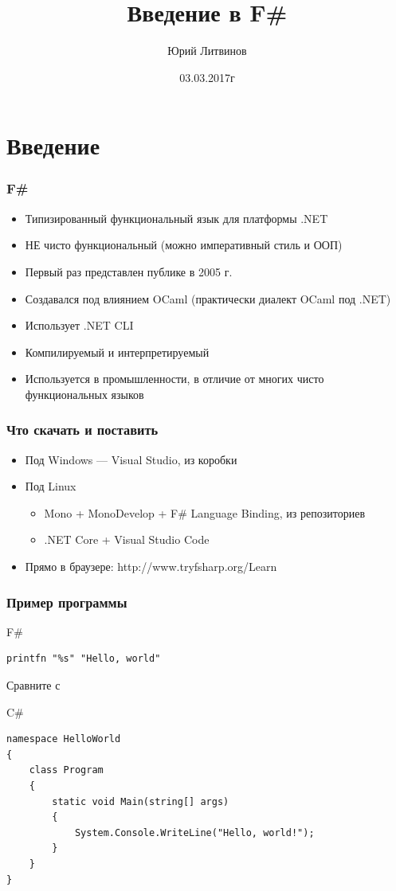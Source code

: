 \documentclass[xetex,mathserif,serif]{beamer}
\title{Введение в F\#}
\author{Юрий Литвинов}
\date{03.03.2017г}
\begin{document}
	
	\frame{\titlepage}
	
	\section{Введение}
	
	\begin{frame}
		\frametitle{F\#}
		\begin{itemize}
			\item Типизированный функциональный язык для платформы .NET
			\item НЕ чисто функциональный (можно императивный стиль и ООП)
			\item Первый раз представлен публике в 2005 г.
			\item Создавался под влиянием OCaml (практически диалект OCaml под .NET)
			\item Использует .NET CLI
			\item Компилируемый и интерпретируемый
			\item Используется в промышленности, в отличие от многих чисто функциональных языков
		\end{itemize}
	\end{frame}

	\begin{frame}
		\frametitle{Что скачать и поставить}
		\begin{itemize}
			\item Под Windows --- Visual Studio, из коробки
			\item Под Linux
			\begin{itemize}
				\item Mono + MonoDevelop + F\# Language Binding, из репозиториев
				\item .NET Core + Visual Studio Code
			\end{itemize}
			\item Прямо в браузере: http://www.tryfsharp.org/Learn
		\end{itemize}
	\end{frame}
	
	\begin{frame}[fragile]
		\frametitle{Пример программы}
		\begin{exampleblock}{F\#}
			\begin{verbatim}
printfn "%s" "Hello, world"
			\end{verbatim}
		\end{exampleblock}
		Сравните с
		\begin{exampleblock}{C\#}
			\begin{verbatim}
namespace HelloWorld
{
    class Program
    {
        static void Main(string[] args)
        {
            System.Console.WriteLine("Hello, world!");
        }
    }
}
			\end{verbatim}
		\end{exampleblock}
\end{frame}
		
\end{document}
